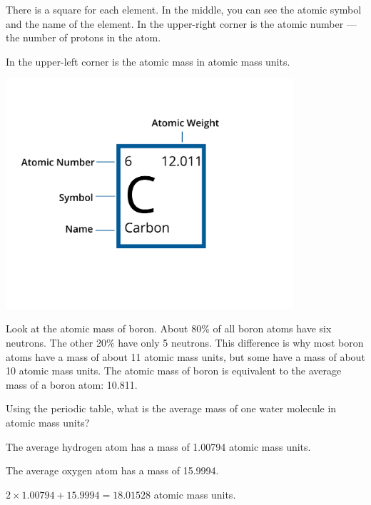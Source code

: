 
\pagebreak
There is a square for each element. In the middle, you can see the atomic
symbol and the name of the element. In the upper-right corner is the
atomic number --- the number of protons in the atom.

In the upper-left corner is the atomic mass in atomic mass units.

\includegraphics[width=0.8\textwidth]{element.png}

Look at the atomic mass of boron. About 80\% of all boron atoms have
six neutrons. The other 20\% have only 5 neutrons. This difference is why most boron atoms
have a mass of about 11 atomic mass units, but some have a mass of
about 10 atomic mass units. The atomic mass of boron is equivalent to the average
mass of a boron atom: 10.811.

\begin{Exercise}[title={Mass of a Water Molecule}, label=water_mass]

Using the periodic table, what is the average mass of one water molecule in atomic mass units?

\end{Exercise}
\begin{Answer}[ref=water_mass]

  The average hydrogen atom has a mass of 1.00794 atomic mass units.

  The average oxygen atom has a mass of 15.9994.

  $2 \times 1.00794 + 15.9994 = 18.01528$ atomic mass units.

\end{Answer}

